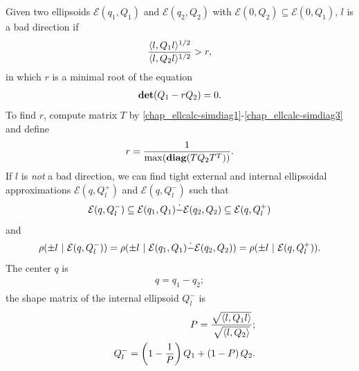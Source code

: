 \documentclass[letterpaper,10pt,english]{sphinxmanual}
\begin{document}
Given two ellipsoids \({\mathcal E}(q_1,Q_1)\) and
\({\mathcal E}(q_2,Q_2)\) with
\({\mathcal E}(0,Q_2)\subseteq{\mathcal E}(0,Q_1)\), \(l\) is a
bad direction if
\begin{gather}
\begin{split}\frac{\langle l,Q_1l\rangle^{1/2}}{\langle l,Q_2l\rangle^{1/2}}>r,\end{split}\notag
\end{gather}
in which \(r\) is a minimal root of the equation
\begin{gather}
\begin{split}{\bf det}(Q_1-rQ_2) = 0.\end{split}\notag
\end{gather}
To find \(r\), compute matrix \(T\) by \eqref{chap_ellcalc-simdiag1}-\eqref{chap_ellcalc-simdiag3}
and define
\begin{gather}
\begin{split}r = \frac{1}{\max({\bf diag}(TQ_2T^T))}.\end{split}\notag
\end{gather}
If \(l\) is \emph{not} a bad direction, we can find tight external and
internal ellipsoidal approximations \({\mathcal E}(q,Q^+_l)\) and
\({\mathcal E}(q,Q^-_l)\) such that
\begin{gather}
\begin{split}{\mathcal E}(q,Q^-_l)\subseteq{\mathcal E}(q_1,Q_1)\dot{-}{\mathcal E}(q_2,Q_2)\subseteq{\mathcal E}(q,Q^+_l)\end{split}\notag
\end{gather}
and
\begin{gather}
\begin{split}\rho(\pm l ~|~ {\mathcal E}(q,Q_l^-)) =
\rho(\pm l ~|~ {\mathcal E}(q_1,Q_1)\dot{-}{\mathcal E}(q_2,Q_2)) =
\rho(\pm l ~|~ {\mathcal E}(q,Q_l^+)).\end{split}\notag
\end{gather}
The center \(q\) is
\label{chap_ellcalc:equation-minkdiff_c}\begin{gather}
\begin{split}q = q_1 - q_2;\end{split}\label{chap_ellcalc-minkdiff_c}
\end{gather}
the shape matrix of the internal ellipsoid \(Q^-_l\) is
\begin{gather}
\begin{split}\begin{aligned}
&& P = \frac{\sqrt{\langle l, Q_1 l\rangle}}{\sqrt{\langle l, Q_2 \rangle}};\nonumber\\
&& Q^-_l = \left(1 - \dfrac{1}{P}\right)Q_1 + \left(1 - P\right)Q_2.
\label{minkdiff_ia}\end{aligned}\end{split}\notag
\end{gather}
\end{document}
